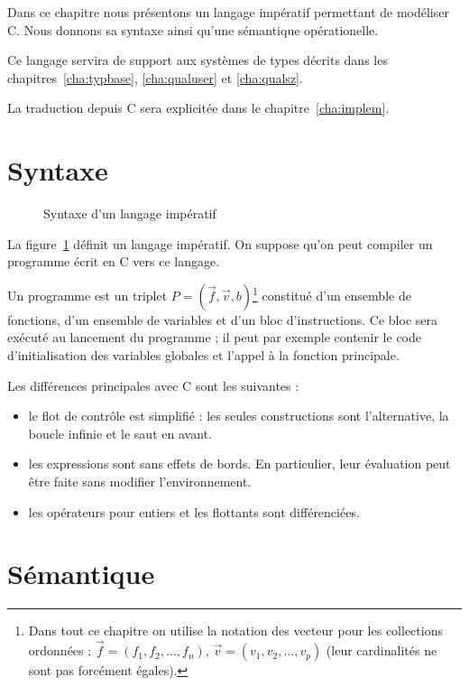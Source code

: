 Dans ce chapitre nous présentons un langage impératif permettant de modéliser C.
Nous donnons sa syntaxe ainsi qu'une sémantique opérationelle.

Ce langage servira de support aux systèmes de types décrits dans les
chapitres~\ref{cha:typbase}, \ref{cha:qualuser} et \ref{cha:qualsz}.

La traduction depuis C sera explicitée dans le chapitre~\ref{cha:implem}.

\section{Syntaxe}

\begin{figure}

\caption{Syntaxe d'un langage impératif}
\label{fig:syntx}
\end{figure}


La figure~\ref{fig:syntx} définit un langage impératif. On suppose qu'on peut
compiler un programme écrit en C vers ce langage.

Un programme est un triplet $P = (\vec{f}, \vec{v}, b)$\footnote{Dans tout ce
chapitre on utilise la notation des vecteur pour les collections ordonnées :
$\vec{f} = (f_1, f_2, …, f_n)$, $\vec{v} = (v_1, v_2, …, v_p)$ (leur
cardinalités ne sont pas forcément égales).} constitué d'un ensemble de
fonctions, d'un ensemble de variables et d'un bloc d'instructions. Ce bloc sera
exécuté au lancement du programme ; il peut par exemple contenir le code
d'initialisation des variables globales et l'appel à la fonction principale.


Les différences principales avec C sont les suivantes :

\begin{itemize}
\item
  le flot de contrôle est simplifié : les seules constructions sont
  l'alternative, la boucle infinie et le saut en avant.
\item
  les expressions sont sans effets de bords. En particulier, leur
  évaluation peut être faite sans modifier l'environnement.
\item
  les opérateurs pour entiers et les flottants sont différenciées.
\end{itemize}

\section{Sémantique}


